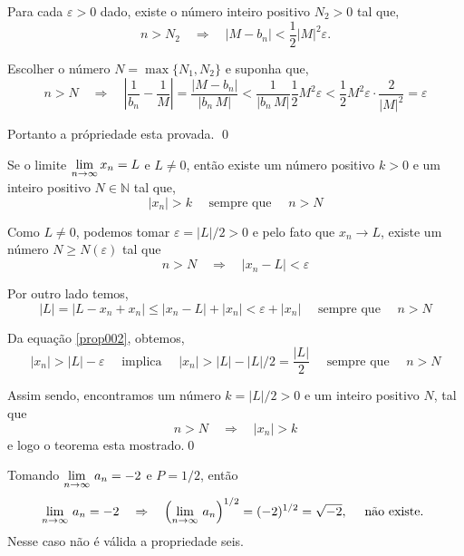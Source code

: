 Para cada $\varepsilon>0$ dado, existe o n\'{u}mero inteiro positivo $N_2>0$ tal que,
\begin{equation*}
    n>N_2\quad \Rightarrow \quad |M-b_n|<\dfrac{1}{2}|M|^2\varepsilon.
\end{equation*}

Escolher o n\'{u}mero $N=\max\{N_1, N_2\}$ e suponha que,
\begin{equation*}
    n>N \quad\Rightarrow\quad \left|\frac{1}{b_n}-\frac{1}{M}\right|=\frac{|M-b_n|}{|b_n\,M|}<\frac{1}{|b_n\,M|}\frac{1}{2}M^2\varepsilon<\frac{1}{2}M^2\varepsilon\cdot \frac{2}{|M|^2}=\varepsilon
\end{equation*}

Portanto a pr\'{o}priedade esta provada. \qed

\begin{fteo}
Se o limite $\displaystyle{\lim_{n\to\infty}x_n=L}$ e $L\neq 0$, ent\~{a}o existe um n\'{u}mero positivo $k>0$ e um inteiro positivo $N\in \mathbb{N}$ tal que,
\begin{equation*}
    |x_n|>k \quad \text{ sempre que }\quad n > N
\end{equation*}
\end{fteo}

\prova Como $L\neq 0$, podemos tomar $\varepsilon=|L|/2>0$ e pelo fato que $x_n\to L$, existe um n\'{u}mero $N\geq N(\varepsilon)$ tal que
\begin{equation*}
    n >N \quad \Rightarrow \quad |x_n-L|<\varepsilon
\end{equation*}

Por outro lado temos,
\begin{equation}\label{prop002}
    |L|=|L-x_n + x_n|\leq |x_n-L|+|x_n|<\varepsilon + |x_n|\quad \text{ sempre que } \quad n >N
\end{equation}

Da equa\c{c}\~{a}o \eqref{prop002}, obtemos,
\begin{equation*}
    |x_n|>|L|-\varepsilon\quad \text{ implica }\quad |x_n|>|L|-|L|/2=\dfrac{|L|}{2}\quad  \text{ sempre que } \quad n>N
\end{equation*}

Assim sendo, encontramos um n\'{u}mero $k=|L|/2>0$ e um inteiro positivo $N$, tal que
\begin{equation*}
    n >N \quad \Rightarrow\quad |x_n|>k
\end{equation*}
e logo o teorema esta mostrado.\qed

\begin{obs}
Tomando $\displaystyle{\lim_{n\to\infty}\,a_n=-2}$ e $P=1/2$, ent\~{a}o
\begin{equation*}
\lim_{n\to\infty}\,a_n=-2\quad \Rightarrow\quad
\left(\lim_{n\to\infty}\,a_n\right)^{1/2}=(-2)^{1/2}=\sqrt{-2},\quad
\text{ n\~{a}o existe. }
\end{equation*}
 Nesse caso n\~{a}o \'{e} v\'{a}lida a propriedade seis.
\end{obs}

